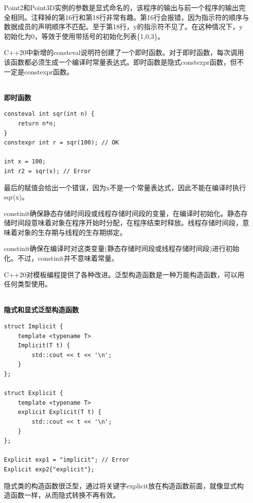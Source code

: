 Point2和Point3D实例的参数是显式命名的，该程序的输出与前一个程序的输出完全相同。注释掉的第16行和第18行非常有趣。第16行会报错，因为指示符的顺序与数据成员的声明顺序不匹配。至于第18行，y的指示符不见了。在这种情况下，y初始化为0，等效于使用带括号的初始化列表\{1,0,3\}。


C++20中新增的consteval说明符创建了一个即时函数。对于即时函数，每次调用该函数都必须生成一个编译时常量表达式。即时函数是隐式constexpr函数，但不一定是constexpr函数。

\hspace*{\fill} \\ %
\noindent
\textbf{即时函数}
\begin{lstlisting}[style=styleCXX]
consteval int sqr(int n) {
	return n*n;
}
constexpr int r = sqr(100); // OK

int x = 100;
int r2 = sqr(x); // Error
\end{lstlisting}

最后的赋值会给出一个错误，因为x不是一个常量表达式，因此不能在编译时执行sqr(x)。

constinit确保静态存储时间段或线程存储时间段的变量，在编译时初始化。静态存储时间段意味着对象在程序开始时分配，在程序结束时释放。线程存储时间段，意味着对象的生存期与线程的生存期绑定。

constinit确保在编译时对这类变量(静态存储时间段或线程存储时间段)进行初始化。不过，constinit并不意味着常量。


C++20对模板编程提供了各种改进。泛型构造函数是一种万能构造函数，可以用任何类型使用。

\hspace*{\fill} \\ %
\noindent
\textbf{隐式和显式泛型构造函数}
\begin{lstlisting}[style=styleCXX]
struct Implicit {
	template <typename T>
	Implicit(T t) {
		std::cout << t << '\n';
	}
};

struct Explicit {
	template <typename T>
	explicit Explicit(T t) {
		std::cout << t << '\n';
	}
};

Explicit exp1 = "implicit"; // Error
Explicit exp2{"explicit"};
\end{lstlisting}

隐式类的构造函数很泛型，通过将关键字explicit放在构造函数前面，就像显式构造函数一样，从而隐式转换不再有效。

